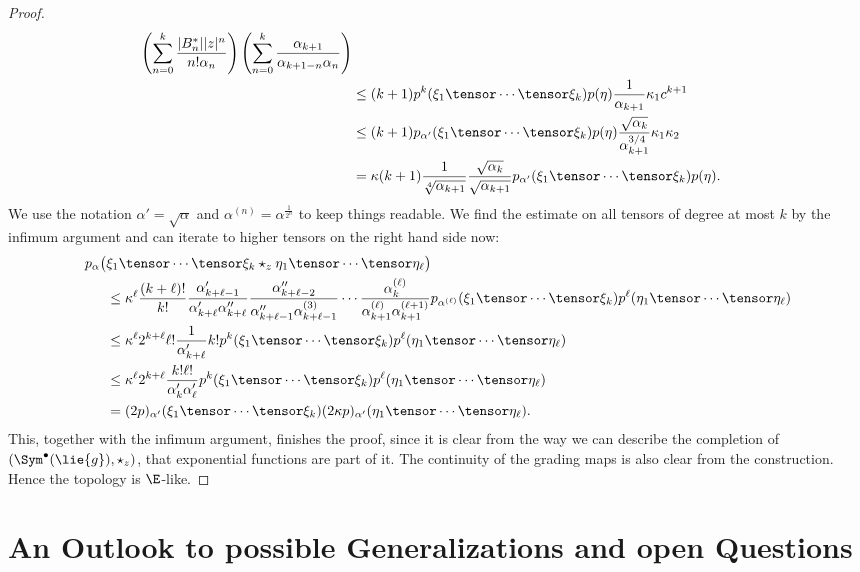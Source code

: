 \documentclass[
11pt,                          %
english                        %
]{article}
\begin{document}
\begin{proof}
\begin{align*}
		\left(
			\sum\limits_{n=0}^k
			\frac{|B_n^*| |z|^n}{n! \alpha_n}
		\right)
		\left(
			\sum\limits_{n=0}^k
			\frac{\alpha_{k+1}}{\alpha_{k+1-n} \alpha_n}
		\right)
		\\
		& \leq
		(k+1) 
		p^k(\xi_1 \tensor \cdots \tensor \xi_k)
		p(\eta)
		\frac{1}{\alpha_{k+1}}
		\kappa_1
		c^{k+1}
		\\
		& \leq
		(k+1) 
		p_{\alpha'}(\xi_1 \tensor \cdots \tensor \xi_k)
		p(\eta)
		\frac{\sqrt{\alpha_k}}{\alpha_{k+1}^{3/4}}
		\kappa_1
		\kappa_2
		\\
		&=
		\kappa
		(k+1)
		\frac{1}{\sqrt[4]{\alpha_{k+1}}}
		\frac{\sqrt{\alpha_k}}{\sqrt{\alpha_{k+1}}}
		p_{\alpha'}(\xi_1 \tensor \cdots \tensor \xi_k)
		p(\eta).
	\end{align*}
	We use the notation $\alpha' = \sqrt{\alpha}$ and $\alpha^{(n)} = 
	\alpha^{\frac{1}{2^n}}$ to keep things readable. We find the estimate on all 
	tensors of degree at most $k$ by the infimum argument and can iterate to higher 
	tensors on the right hand side now:
	\begin{align*}
		p_\alpha \big(
		&
			\xi_1 \tensor \cdots \tensor \xi_k
			\star_z
			\eta_1 \tensor \cdots \tensor \eta_\ell
		\big)
		\\
		& \leq
		\kappa^\ell
		\frac{(k + \ell)!}{k!}
		\frac{\alpha_{k + \ell - 1}'}{\alpha_{k + \ell}' \alpha_{k+\ell}''}
		\frac{\alpha_{k + \ell - 2}''}
		{\alpha_{k + \ell - 1}'' \alpha_{k+\ell-1}^{(3)}}
		\cdots
		\frac{\alpha_{k}^{(\ell)}}
		{\alpha_{k + 1}^{(\ell)} \alpha_{k+1}^{(\ell + 1)}}
		p_{\alpha^{(\ell)}} (\xi_1 \tensor \cdots \tensor \xi_k)
		p^\ell ( \eta_1 \tensor \cdots \tensor \eta_\ell )
		\\
		& \leq
		\kappa^\ell
		2^{k + \ell}
		\ell!
		\frac{1}{\alpha_{k + \ell}'}
		k!
		p^k (\xi_1 \tensor \cdots \tensor \xi_k)
		p^\ell ( \eta_1 \tensor \cdots \tensor \eta_\ell )
		\\
		& \leq
		\kappa^\ell
		2^{k + \ell}
		\frac{k! \ell!}{\alpha_k' \alpha_\ell '}
		p^k (\xi_1 \tensor \cdots \tensor \xi_k)
		p^\ell ( \eta_1 \tensor \cdots \tensor \eta_\ell )
		\\
		&=
		(2p)_{\alpha'} (\xi_1 \tensor \cdots \tensor \xi_k)
		(2 \kappa p)_{\alpha'} ( \eta_1 \tensor \cdots \tensor \eta_\ell ).
	\end{align*}
	This, together with the infimum argument, finishes the proof, since it is clear 
	from the way we can describe the completion of $\left( \Sym^{\bullet}(\lie{g}), 
	\star_z \right)$, that exponential functions are part of it. The continuity of 
	the grading maps is also clear from the construction. Hence the topology is 
	$\E$-like.
\end{proof}



\section{An Outlook to possible Generalizations and open Questions}
\end{document}
